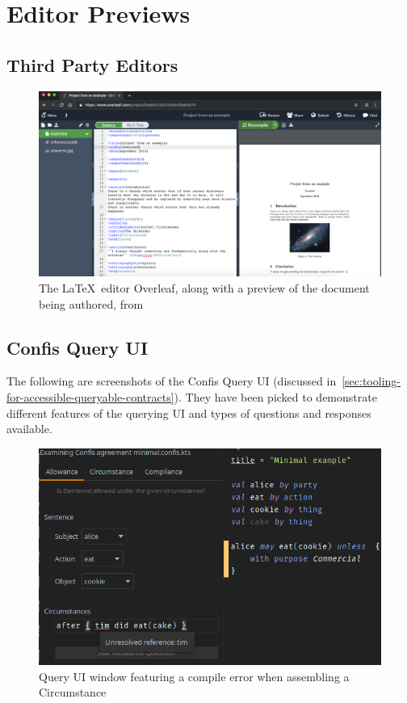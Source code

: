 \chapter{Editor Previews}\label{ch:editor-previews}

\section{Third Party Editors}\label{sec:third-partty-editors}

\begin{figure}[h]
    \centering
    \includegraphics[width=\textwidth]{figures/overleafEditor}
    \caption{The \LaTeX \ editor Overleaf, along with a preview of the document being authored, from~\cite{overleafDocs}}
    \label{fig:overleafPreview}
\end{figure}

\section{Confis Query UI}\label{sec:app:confis-query-ui}

The following are screenshots of the Confis Query UI (discussed in~\autoref{sec:tooling-for-accessible-queryable-contracts}).
They have been picked to demonstrate different features of the querying UI and types of questions and responses available.

\begin{figure}[h]
    \centering
    \includegraphics[width=\textwidth]{figures/queryUi-compileError}
    \caption{Query UI window featuring a compile error when assembling a Circumstance}
    \label{fig:queryUI:circumstanceError}
\end{figure}

